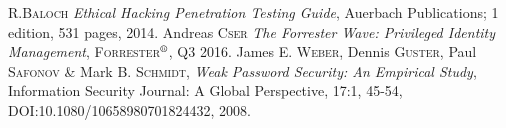 \begin{thebibliography}{ABC}	
     R.\textsc{Baloch} \emph{Ethical Hacking Penetration Testing Guide}, Auerbach Publications; 1 edition, 531 pages, 2014.
     Andreas \textsc{Cser} \emph{The Forrester Wave\texttrademark: Privileged Identity Management}, \textsc{Forrester$^{\mbox{\scriptsize{\textregistered}}}$}, Q3 2016.
     James E. \textsc{Weber}, Dennis \textsc{Guster}, Paul \textsc{Safonov} \& Mark B. \textsc{Schmidt}, \emph{Weak Password Security: An Empirical Study}, Information Security Journal: A Global Perspective, 17:1, 45-54, DOI:10.1080/10658980701824432, 2008.
\end{thebibliography}

